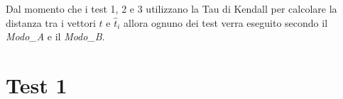  Dal momento che i test 1, 2 e 3 utilizzano la Tau di Kendall per calcolare la distanza tra i vettori \(t\) e \(\hat{t}_i\) allora ognuno dei test verra eseguito secondo il \textit{Modo\_A} e il \textit{Modo\_B}.
 
 \section{Test 1}











